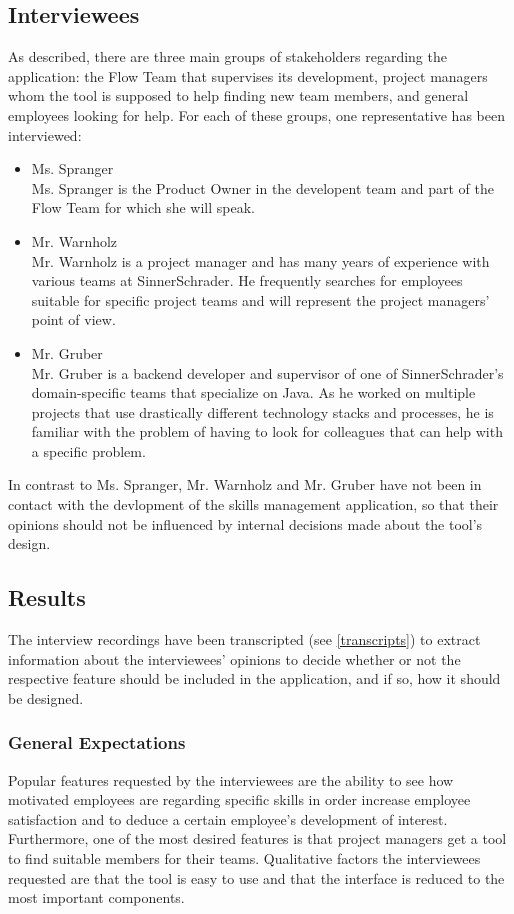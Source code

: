 \newpage

\subsection{Interviewees}
As described, there are three main groups of stakeholders regarding the application: the Flow Team that supervises its development, project managers whom the tool is supposed to help finding new team members, and general employees looking for help. For each of these groups, one representative has been interviewed:
\begin{itemize}
	\item Ms. Spranger\\
	Ms. Spranger is the Product Owner in the developent team and part of the Flow Team for which she will speak.
	\item Mr. Warnholz\\
	Mr. Warnholz is a project manager and has many years of experience with various teams at SinnerSchrader. He frequently searches for
	employees suitable for specific project teams and will represent the project managers' point of view.
	\item Mr. Gruber\\
	Mr. Gruber is a backend developer and supervisor of one of SinnerSchrader's domain-specific teams that specialize on Java. As he worked on multiple projects that
	use drastically different technology stacks and processes, he is familiar with the problem of having to look for colleagues that can help with a specific problem.
\end{itemize}
In contrast to Ms. Spranger, Mr. Warnholz and Mr. Gruber have not been in contact with the devlopment of the skills management application, so that their opinions should not be influenced by internal decisions made about the tool's design.

\subsection{Results}
The interview recordings have been transcripted (see \ref{transcripts}) to extract information about the interviewees' opinions to decide whether or not the respective feature should be included in the application, and if so, how it should be designed.

\subsubsection{General Expectations}
Popular features requested by the interviewees are the ability to see how motivated employees are regarding specific skills in order increase employee satisfaction and to deduce a certain employee's development of interest. Furthermore, one of the most desired features is that project managers get a tool to find suitable members for their teams. Qualitative factors the interviewees requested are that the tool is easy to use and that the interface is reduced to the most important components.

